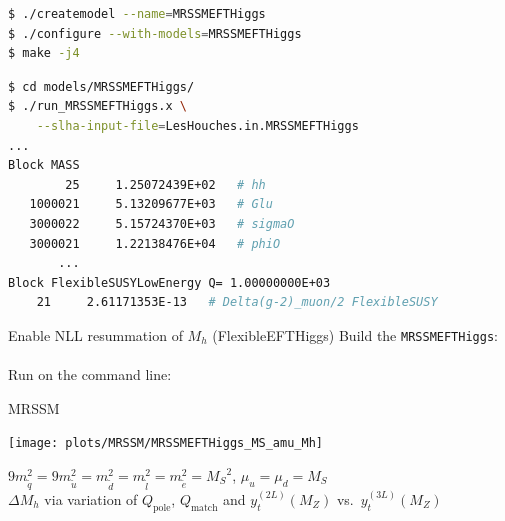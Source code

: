 \documentclass[hyperref={pdfpagelabels=false},ngerman]{beamer}
\newcommand{\MS}{\ensuremath{M_S}}
\newcommand{\pole}{\ensuremath{\text{pole}}}
\begin{document}
\begin{lrbox}{\listbox}\begin{lstlisting}[language=bash]
$ ./createmodel --name=MRSSMEFTHiggs
$ ./configure --with-models=MRSSMEFTHiggs
$ make -j4
\end{lstlisting}\end{lrbox} %

\begin{lrbox}{\listboxt}\begin{lstlisting}[language=bash]
$ cd models/MRSSMEFTHiggs/
$ ./run_MRSSMEFTHiggs.x \
    --slha-input-file=LesHouches.in.MRSSMEFTHiggs
...
Block MASS
        25     1.25072439E+02   # hh
   1000021     5.13209677E+03   # Glu
   3000022     5.15724370E+03   # sigmaO
   3000021     1.22138476E+04   # phiO
       ...
Block FlexibleSUSYLowEnergy Q= 1.00000000E+03
    21     2.61171353E-13   # Delta(g-2)_muon/2 FlexibleSUSY
\end{lstlisting}\end{lrbox} %

\begin{frame}{Enable NLL resummation of $M_h$ (FlexibleEFTHiggs)}
  Build the \texttt{MRSSMEFTHiggs}:\\[1.5em]
  \usebox{\listbox}
  \\[1em]
  Run on the command line:
  \\[1.5em]
  \usebox{\listboxt}
\end{frame}

\begin{frame}{MRSSM}
  \begin{center}
    \texttt{[image: plots/MRSSM/MRSSMEFTHiggs\_MS\_amu\_Mh]}
  \end{center}
  $9 m_{\tilde{q}}^2 = 9 m_{\tilde{u}}^2 = m_{\tilde{d}}^2 =
  m_{\tilde{l}}^2 = m_{\tilde{e}}^2 = \MS^2$, $\mu_u = \mu_d = \MS$\\
  $\Delta M_h$ via variation of $Q_\pole$, $Q_\text{match}$ and $y_t^{(2L)}(M_Z)$ vs.\ $y_t^{(3L)}(M_Z)$
\end{frame}
\end{document}

